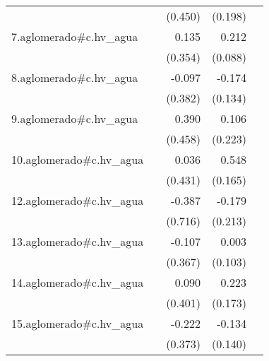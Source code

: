 {\begin{longtable}{l*{4}{D{.}{.}{-1}}}
            &                     &     (0.450)         &     (0.198)         &                     \\
\addlinespace
7.aglomerado#c.hv\_agua&                     &       0.135         &       0.212\sym{*}  &                     \\
            &                     &     (0.354)         &     (0.088)         &                     \\
\addlinespace
8.aglomerado#c.hv\_agua&                     &      -0.097         &      -0.174         &                     \\
            &                     &     (0.382)         &     (0.134)         &                     \\
\addlinespace
9.aglomerado#c.hv\_agua&                     &       0.390         &       0.106         &                     \\
            &                     &     (0.458)         &     (0.223)         &                     \\
\addlinespace
10.aglomerado#c.hv\_agua&                     &       0.036         &       0.548\sym{***}&                     \\
            &                     &     (0.431)         &     (0.165)         &                     \\
\addlinespace
12.aglomerado#c.hv\_agua&                     &      -0.387         &      -0.179         &                     \\
            &                     &     (0.716)         &     (0.213)         &                     \\
\addlinespace
13.aglomerado#c.hv\_agua&                     &      -0.107         &       0.003         &                     \\
            &                     &     (0.367)         &     (0.103)         &                     \\
\addlinespace
14.aglomerado#c.hv\_agua&                     &       0.090         &       0.223         &                     \\
            &                     &     (0.401)         &     (0.173)         &                     \\
\addlinespace
15.aglomerado#c.hv\_agua&                     &      -0.222         &      -0.134         &                     \\
            &                     &     (0.373)         &     (0.140)         &                     \\

\end{longtable}}
